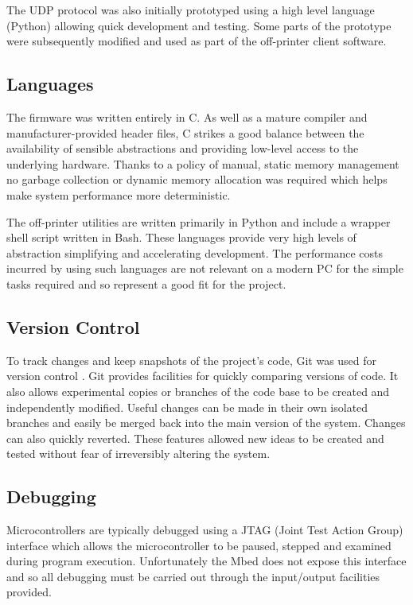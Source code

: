 			The UDP protocol was also initially prototyped using a high level language
			(Python) allowing quick development and testing. Some parts of the
			prototype were subsequently modified and used as part of the off-printer
			client software.
		
		
		\subsection{Languages}
			
			The firmware was written entirely in C. As well as a mature compiler and
			manufacturer-provided header files, C strikes a good balance between the
			availability of sensible abstractions and providing low-level access to
			the underlying hardware. Thanks to a policy of manual, static memory
			management no garbage collection or dynamic memory allocation was required
			which helps make system performance more deterministic.
			
			The off-printer utilities are written primarily in Python and include a
			wrapper shell script written in Bash. These languages provide very high
			levels of abstraction simplifying and accelerating development. The
			performance costs incurred by using such languages are not relevant on a
			modern PC for the simple tasks required and so represent a good fit for
			the project.
			
		\subsection{Version Control}
			
			To track changes and keep snapshots of the project's code, Git was used
			for version control \cite{git}. Git provides facilities for quickly
			comparing versions of code. It also allows experimental copies or branches
			of the code base to be created and independently modified. Useful changes
			can be made in their own isolated branches and easily be merged back into
			the main version of the system. Changes can also quickly reverted. These
			features allowed new ideas to be created and tested without fear of
			irreversibly altering the system.
		
		\subsection{Debugging}
			
			Microcontrollers are typically debugged using a JTAG (Joint Test Action
			Group) interface which allows the microcontroller to be paused, stepped
			and examined during program execution. Unfortunately the Mbed does not
			expose this interface and so all debugging must be carried out through the
			input/output facilities provided.
			
